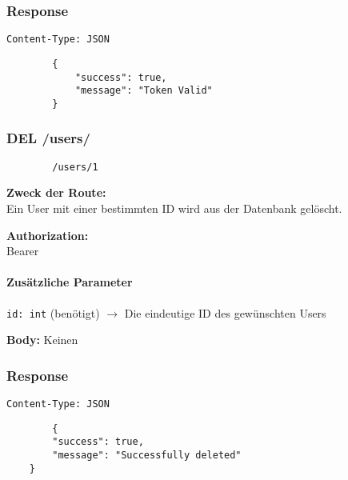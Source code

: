 \subsubsection{Response}

\begin{code}
    \lstinline{Content-Type: JSON}
    \begin{lstlisting}
        {
            "success": true,
            "message": "Token Valid"
        }
    \end{lstlisting}
    \caption{Response für die Validate Token Route}
\end{code}

\pagebreak

\subsubsection{DEL /users/}

\begin{code}
    \begin{lstlisting}
        /users/1
    \end{lstlisting}
    \caption{Body der aktuellen Route}
\end{code}

\textbf{Zweck der Route:} \\
Ein User mit einer bestimmten ID wird aus der Datenbank gelöscht.

\textbf{Authorization:} \\
Bearer

\paragraph{Zusätzliche Parameter}
\lstinline{id: int} (benötigt)
$\rightarrow$ Die eindeutige ID des gewünschten Users

\textbf{Body:}
Keinen


\subsubsection{Response}

\begin{code}
    \lstinline{Content-Type: JSON}
    \begin{lstlisting}
        {
        "success": true,
        "message": "Successfully deleted"
    }
    \end{lstlisting}
    \caption{Response für die delete User Route}
\end{code}

